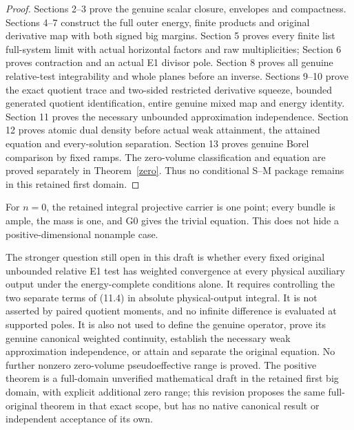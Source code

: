 \documentclass[10pt]{article}
\begin{document}
\begin{proof}
Sections 2--3 prove the genuine scalar closure, envelopes and compactness.
Sections 4--7 construct the full outer energy, finite products and original
derivative map with both signed big margins. Section 5 proves every finite
list full-system limit with actual horizontal factors and raw multiplicities;
Section 6 proves contraction and an actual E1 divisor pole. Section 8 proves
all genuine relative-test integrability and whole planes before an inverse.
Sections 9--10 prove the exact quotient trace and two-sided restricted
derivative squeeze, bounded generated quotient identification, entire genuine
mixed map and energy identity. Section 11 proves the necessary unbounded
approximation independence. Section 12 proves atomic dual density before
actual weak attainment, the attained equation and every-solution separation.
Section 13 proves genuine Borel comparison by fixed ramps. The zero-volume
classification and equation are proved separately in Theorem~\ref{zero}.
Thus no conditional S--M package remains in this retained first domain.
\end{proof}

For $n=0$, the retained integral projective carrier is one point; every
bundle is ample, the mass is one, and G0 gives the trivial equation. This
does not hide a positive-dimensional nonample case.

The stronger question still open in this draft is whether every fixed
original unbounded relative E1 test has weighted convergence at every
physical auxiliary output under the energy-complete conditions alone.
It requires controlling the two separate terms of (11.4) in absolute
physical-output integral. It is not asserted by paired quotient moments,
and no infinite difference is evaluated at supported poles. It is also
not used to define the genuine operator, prove its genuine canonical
weighted continuity, establish the necessary weak approximation
independence, or attain and separate the original equation. No further
nonzero zero-volume pseudoeffective range is proved. The positive theorem
is a full-domain unverified mathematical draft in the retained first big
domain, with explicit additional zero range; this revision proposes
the same full-original theorem in that exact scope, but has no native
canonical result or independent acceptance of its own.

\appendix
\end{document}
